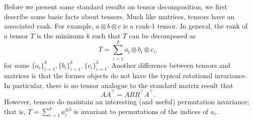 Before we present some standard results on tensor decomposition, we first describe some basic facts about tensors. Much like matrices, tensors have an associated rank. For example, $a \otimes b \otimes c$ is a rank-1 tensor. In general, the rank of a tensor $T$ is the minimum $k$ such that $T$ can be decomposed as 
\begin{equation}
    T = \sum_{i=1}^k a_i \otimes b_i \otimes c_i.
\end{equation} 
for some $\{a_i\}_{i =1}^k, \{b_i\}_{i =1}^k, \{c_i\}_{i =1}^k$.
Another difference between tensors and matrices is that the former objects do not have the typical rotational invariance. In particular, there is no tensor analogue to the standard matrix result that 
\begin{equation}
    AA^\top = A RR^\top A^\top.
\end{equation}
However, tensors do maintain an interesting (and useful) permutation invariance; that is, $T = \sum_{i = 1}^k a_i^{\otimes 3}$ is invariant to permutations of the indices of $a_i$.

